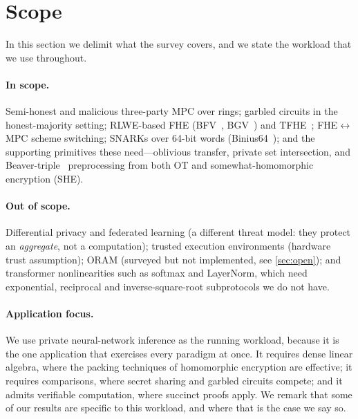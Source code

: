 \documentclass[11pt]{article}
\begin{document}
\section{Scope}
\label{sec:scope}

In this section we delimit what the survey covers, and we state the workload that we
use throughout.

\paragraph{In scope.} Semi-honest and malicious three-party MPC over rings;
garbled circuits in the honest-majority setting; RLWE-based FHE (BFV~\cite{FV},
BGV~\cite{BGV}) and TFHE~\cite{TFHE}; FHE$\leftrightarrow$MPC
scheme switching; SNARKs over 64-bit words (Binius64~\cite{Binius}); and the
supporting primitives these need---oblivious transfer, private set intersection,
and Beaver-triple~\cite{Beaver} preprocessing from both OT and
somewhat-homomorphic encryption (SHE).

\paragraph{Out of scope.} Differential privacy and federated learning (a
different threat model: they protect an \emph{aggregate}, not a computation);
trusted execution environments (hardware trust assumption); ORAM (surveyed but
not implemented, see \cref{sec:open}); and transformer nonlinearities such as
softmax and LayerNorm, which need exponential, reciprocal and inverse-square-root
subprotocols we do not have.

\paragraph{Application focus.} We use private neural-network inference as the running
workload, because it is the one application that exercises every paradigm at once. It
requires dense linear algebra, where the packing techniques of homomorphic encryption are
effective; it requires comparisons, where secret sharing and garbled circuits compete; and
it admits verifiable computation, where succinct proofs apply. We remark that some of our
results are specific to this workload, and where that is the case we say so.


\end{document}
